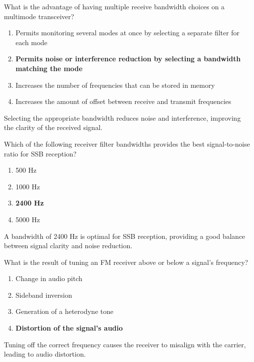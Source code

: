 
\begin{tcolorbox}[colback=gray!10!white,colframe=black!75!black,title={T4B08}]
    What is the advantage of having multiple receive bandwidth choices on a multimode transceiver?
    \begin{enumerate}[label=\Alph*),noitemsep]
        \item Permits monitoring several modes at once by selecting a separate filter for each mode
        \item \textbf{Permits noise or interference reduction by selecting a bandwidth matching the mode}
        \item Increases the number of frequencies that can be stored in memory
        \item Increases the amount of offset between receive and transmit frequencies
    \end{enumerate}
\end{tcolorbox}
Selecting the appropriate bandwidth reduces noise and interference, improving the clarity of the received signal.


\begin{tcolorbox}[colback=gray!10!white,colframe=black!75!black,title={T4B10}]
    Which of the following receiver filter bandwidths provides the best signal-to-noise ratio for SSB reception?
    \begin{enumerate}[label=\Alph*),noitemsep]
        \item 500 Hz
        \item 1000 Hz
        \item \textbf{2400 Hz}
        \item 5000 Hz
    \end{enumerate}
\end{tcolorbox}
A bandwidth of 2400 Hz is optimal for SSB reception, providing a good balance between signal clarity and noise reduction.


\begin{tcolorbox}[colback=gray!10!white,colframe=black!75!black,title={T4B12}]
    What is the result of tuning an FM receiver above or below a signal's frequency?
    \begin{enumerate}[label=\Alph*),noitemsep]
        \item Change in audio pitch
        \item Sideband inversion
        \item Generation of a heterodyne tone
        \item \textbf{Distortion of the signal's audio}
    \end{enumerate}
\end{tcolorbox}
Tuning off the correct frequency causes the receiver to misalign with the carrier, leading to audio distortion.

